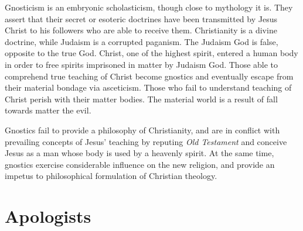 \documentclass[11pt]{article}
\begin{document}
\newline

Gnosticism is an embryonic scholasticism, though close to mythology it is. 
They assert that their secret or esoteric doctrines have been transmitted by Jesus Christ to his followers who are able to receive them. 
Christianity is a divine doctrine, while Judaism is a corrupted paganism. 
The Judaism God is false, opposite to the true God. 
Christ, one of the highest spirit, entered a human body in order to free spirits imprisoned in matter by Judaism God. 
Those able to comprehend true teaching of Christ become gnostics and eventually escape from their material bondage via asceticism. 
Those who fail to understand teaching of Christ perish with their matter bodies. 
The material world is a result of fall towards matter the evil. 

\newline
Gnostics fail to provide a philosophy of Christianity, and are in conflict with prevailing concepts of Jesus' teaching by reputing \textit{Old Testament} and conceive Jesus as a man whose body is used by a heavenly spirit. 
At the same time, gnostics exercise considerable influence on the new religion, and provide an impetus to philosophical formulation of Christian theology.

\section{Apologists}
\end{document}
